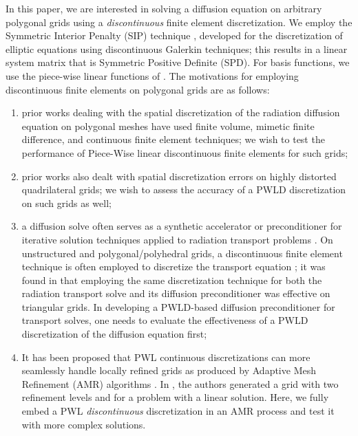 \documentclass[preprint,10pt]{elsarticle}
\begin{document}
In this paper, we are interested in solving a diffusion equation on arbitrary polygonal
grids using a {\em discontinuous} finite element discretization. We employ the
Symmetric Interior Penalty (SIP) technique \cite{Arnold1982,DouglasN.Arnold2002,Kanschat2007,Riviere2008}, 
developed for the discretization of elliptic equations using discontinuous Galerkin techniques;
this results in a linear system matrix that is Symmetric Positive Definite (SPD). For basis functions,
we use the piece-wise linear functions of \cite{BaileyAdams2008}.
The motivations for employing discontinuous finite elements on polygonal grids are as follows: 
\begin{enumerate}
\item 
	prior works dealing with the spatial discretization of the radiation diffusion equation on polygonal meshes 
	have used finite volume, mimetic finite difference, and continuous finite element techniques;  
	we wish to test the performance of Piece-Wise linear discontinuous finite elements for such grids;
\item prior works also dealt with spatial discretization errors on highly distorted quadrilateral grids; 
  we wish to assess the accuracy of a PWLD discretization on such grids as well; 
\item a diffusion solve often serves as a synthetic accelerator or preconditioner for 
  iterative solution techniques applied to radiation transport problems
	\cite{AdamsLarsen2002,JamesS.Warsa2004}. On unstructured and polygonal/polyhedral grids,
	a discontinuous finite element technique is often employed to discretize the transport equation 
	\cite{Wareing_McGhee_Morel_Pautz_DGFEM2001,Warsa2008_CDFEM,Ragusa_Wang_NSE_2009,Bailey_MC2011,Ragusa_Wang_JCP_2011};
	it was found in \cite{Ragusa_Wang_NSE_2010} that employing the same discretization technique for both 
	the radiation transport solve and its diffusion preconditioner was effective on triangular grids.
	In developing a PWLD-based diffusion preconditioner for transport solves, one needs to 
	evaluate the effectiveness of a PWLD discretization of the diffusion equation first;
\item It has been proposed that PWL continuous discretizations can
  more seamlessly handle locally refined grids as produced by Adaptive Mesh Refinement (AMR) algorithms
	\cite{BaileyAdams2008}. In \cite{BaileyAdams2008}, the authors generated a grid with two refinement levels
	and for a problem with a linear solution. Here, we fully embed a PWL \emph{discontinuous} discretization
	in an AMR process and test it with more complex solutions.
\end{enumerate}
\end{document}
